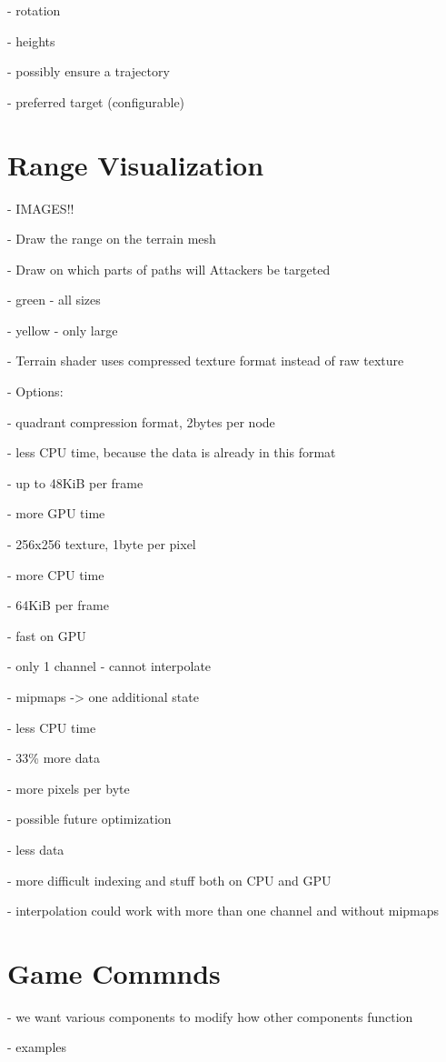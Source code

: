 - rotation

- heights

- possibly ensure a trajectory

- preferred target (configurable)

\section{Range Visualization}

- IMAGES!!

- Draw the range on the terrain mesh

- Draw on which parts of paths will Attackers be targeted

- green - all sizes

- yellow - only large

- Terrain shader uses compressed texture format instead of raw texture

- Options:

- quadrant compression format, 2bytes per node

- less CPU time, because the data is already in this format

- up to 48KiB per frame

- more GPU time

- 256x256 texture, 1byte per pixel

- more CPU time

- 64KiB per frame

- fast on GPU

- only 1 channel - cannot interpolate

- mipmaps -> one additional state

- less CPU time

- 33\% more data

- more pixels per byte

- possible future optimization

- less data

- more difficult indexing and stuff both on CPU and GPU

- interpolation could work with more than one channel and without mipmaps

\section{Game Commnds}

- we want various components to modify how other components function

- examples

